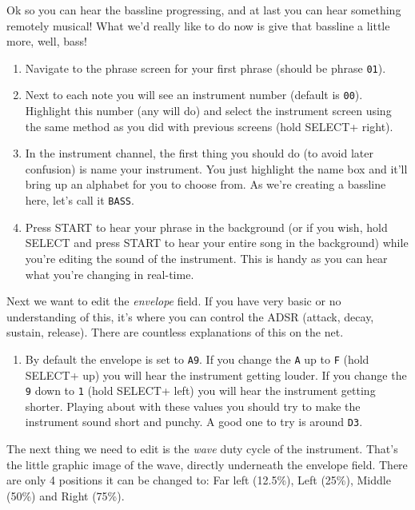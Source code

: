 \documentclass[]{article}
\newcommand{\buttonStyle}[1]{\textsf{#1}\xspace}
\newcommand{\bStart}{\buttonStyle{{START}}}
\newcommand{\bSelect}{\buttonStyle{{SELECT}}}
\newcommand{\bRight}{\buttonStyle{right}}
\newcommand{\bLeft}{\buttonStyle{left}}
\newcommand{\bUp}{\buttonStyle{up}}
\newcommand{\gbtxt}[1]{\texttt{#1}\xspace}
\begin{document}
Ok so you can hear the bassline progressing, and at last you can hear something remotely musical! What we'd really like to do now is give that bassline a little more, well, bass!

\begin{enumerate}
	
\item Navigate to the phrase screen for your first phrase (should be phrase \gbtxt{01}).

\item Next to each note you will see an instrument number (default is \gbtxt{00}). Highlight this number (any will do) and select the instrument screen using the same method as you did with previous screens (hold \bSelect + \bRight).

\item In the instrument channel, the first thing you should do (to avoid later confusion) is name your instrument. You just highlight the name box and it'll bring up an alphabet for you to choose from. As we're creating a bassline here, let's call it \gbtxt{BASS}.

\item Press \bStart to hear your phrase in the background (or if you wish, hold \bSelect and press \bStart to hear your entire song in the background) while you're editing the sound of the instrument. This is handy as you can hear what you're changing in real-time.

\end{enumerate}

Next we want to edit the \textit{envelope} field. If you have very basic or no understanding of this, it's where you can control the ADSR (attack, decay, sustain, release). There are countless explanations of this on the net.

\begin{enumerate}[resume]

\item By default the envelope is set to \gbtxt{A9}. If you change the \gbtxt{A} up to \gbtxt{F} (hold \bSelect + \bUp) you will hear the instrument getting louder. If you change the \gbtxt{9} down to \gbtxt{1} (hold \bSelect + \bLeft) you will hear the instrument getting shorter. Playing about with these values you should try to make the instrument sound short and punchy. A good one to try is around \gbtxt{D3}.

\end{enumerate}

The next thing we need to edit is the \textit{wave} duty cycle of the instrument. That's the little graphic image of the wave, directly underneath the envelope field. There are only 4 positions it can be changed to: Far left (12.5\%), Left (25\%), Middle (50\%) and Right (75\%). 
\end{document}
